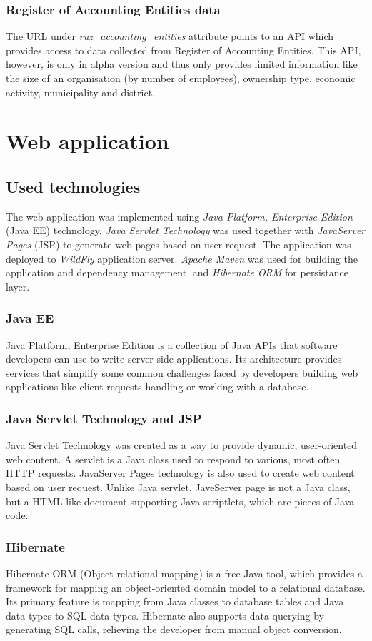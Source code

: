 \documentclass[thesis=B,english]{sprlajur-slovakopendata}[2018/05/12]
\begin{document}
\subsubsection{Register of Accounting Entities data}
The URL under \emph{ruz\_accounting\_entities} attribute points to an API which provides access to data collected from Register of Accounting Entities. This API, however, is only in alpha version and thus only provides limited information like the size of an organisation (by number of employees), ownership type, economic activity, municipality and district.
\section{Web application}
\subsection{Used technologies}
The web application was implemented using \emph{Java Platform, Enterprise Edition} (Java EE) technology. \emph{Java Servlet Technology} was used together with \emph{JavaServer Pages} (JSP) to generate web pages based on user request. The application was deployed to \emph{WildFly} application server. \emph{Apache Maven} was used for building the application and dependency management, and \emph{Hibernate ORM} for persistance layer.
\subsubsection{Java EE}
Java Platform, Enterprise Edition is a collection of Java APIs that software developers can use to write server-side applications. Its architecture provides services that simplify some common challenges faced by developers building web applications like client requests handling or working with a database.
\subsubsection{Java Servlet Technology and JSP}
Java Servlet Technology was created as a way to provide dynamic, user-oriented web content. A servlet is a Java class used to respond to various, most often HTTP requests. JavaServer Pages technology is also used to create web content based on user request. Unlike Java servlet, JaveServer page is not a Java class, but a HTML-like document supporting Java scriptlets, which are pieces of Java-code.
\subsubsection{Hibernate}
Hibernate ORM (Object-relational mapping) is a free Java tool, which provides a framework for mapping an object-oriented domain model to a relational database. Its primary feature is mapping from Java classes to database tables and Java data types to SQL data types. Hibernate also supports data querying by generating SQL calls, relieving the developer from manual object conversion.
\end{document}
